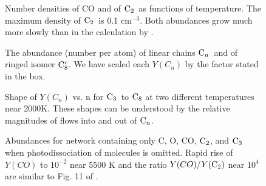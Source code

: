 \documentclass[manuscript]{aastex}
\newcommand{\ctwo}{{\rm C}_2}
\newcommand{\cthree}{{\rm C}_3}
\newcommand{\ceight}{{\rm C}_8}
\newcommand{\ceightr}{{\rm C}_8^r}
\newcommand{\cenn}{{\rm C}_n}
\begin{document}
\clearpage

\begin{figure}
\caption{
Number densities of CO and of $\ctwo$\ as functions of temperature.
The maximum density of $\ctwo$\ is 0.1 cm$^{-3}$.
Both abundances grow much more slowly than in the calculation by
\citet{2009ApJ...703..642C}.} \label{fig:ncoc2}
\end{figure}

\clearpage

\begin{figure}
\caption{
The abundance (number per atom) of linear chains $\cenn$\ and of ringed isomer
$\ceightr$. We have scaled each $Y(C_n)$ by the factor stated in the box.}
\label{fig:yi}
\end{figure}

\clearpage

\begin{figure}
\caption{
Shape of $Y(C_n)$ vs. n for $\cthree$\ to $\ceight$
at two different temperatures
near 2000K. These shapes can be understood by the relative magnitudes of
flows into and out of $\cenn$.
}
\label{fig:cn}
\end{figure}

\clearpage

\begin{figure}
\caption{
Abundances for network containing only C, O, CO, $\ctwo$, and $\cthree$
when photodissociation of molecules is omitted. Rapid rise of $Y(CO)$
to $10^{-2}$ near 5500 K and the ratio $Y(CO)/Y(\ctwo)$ near $10^4$ are
similar to Fig. 11 of \citet{2009ApJ...703..642C}.
}
\label{fig:no_gamma}
\end{figure}

\clearpage
\end{document}
